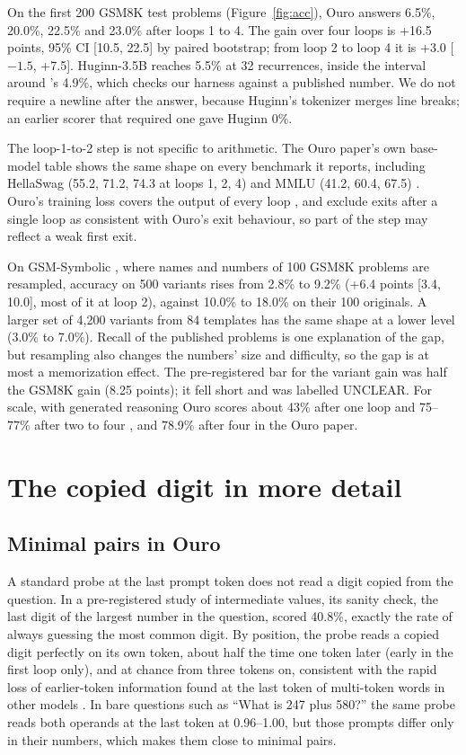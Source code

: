 \documentclass{article}
\begin{document}
On the first 200 GSM8K test problems (Figure~\ref{fig:acc}), Ouro answers 6.5\%, 20.0\%, 22.5\% and 23.0\% after loops 1 to 4. The gain over four loops is +16.5 points, 95\% CI [10.5, 22.5] by paired bootstrap; from loop 2 to loop 4 it is +3.0 [$-1.5$, +7.5]. Huginn-3.5B reaches 5.5\% at 32 recurrences, inside the interval around \citeauthor{lu2025}'s 4.9\%, which checks our harness against a published number. We do not require a newline after the answer, because Huginn's tokenizer merges line breaks; an earlier scorer that required one gave Huginn 0\%.

The loop-1-to-2 step is not specific to arithmetic. The Ouro paper's own base-model table shows the same shape on every benchmark it reports, including HellaSwag (55.2, 71.2, 74.3 at loops 1, 2, 4) and MMLU (41.2, 60.4, 67.5) \citep[Table~10]{zhu2025ouro}. Ouro's training loss covers the output of every loop \citep[Eq.~4]{zhu2025ouro}, and \citet{schwethelm2026b} exclude exits after a single loop as consistent with Ouro's exit behaviour, so part of the step may reflect a weak first exit.

On GSM-Symbolic \citep{mirzadeh2024}, where names and numbers of 100 GSM8K problems are resampled, accuracy on 500 variants rises from 2.8\% to 9.2\% (+6.4 points [3.4, 10.0], most of it at loop 2), against 10.0\% to 18.0\% on their 100 originals. A larger set of 4,200 variants from 84 templates has the same shape at a lower level (3.0\% to 7.0\%). Recall of the published problems is one explanation of the gap, but resampling also changes the numbers' size and difficulty, so the gap is at most a memorization effect. The pre-registered bar for the variant gain was half the GSM8K gain (8.25 points); it fell short and was labelled UNCLEAR. For scale, with generated reasoning Ouro scores about 43\% after one loop and 75--77\% after two to four \citep[Fig.~1]{yang2026stars}, and 78.9\% after four in the Ouro paper.

\section{The copied digit in more detail}\label{app:presence}

\subsection{Minimal pairs in Ouro}\label{sec:mp}

A standard probe at the last prompt token does not read a digit copied from the question. In a pre-registered study of intermediate values, its sanity check, the last digit of the largest number in the question, scored 40.8\%, exactly the rate of always guessing the most common digit. By position, the probe reads a copied digit perfectly on its own token, about half the time one token later (early in the first loop only), and at chance from three tokens on, consistent with the rapid loss of earlier-token information found at the last token of multi-token words in other models \citep{feucht2024}. In bare questions such as ``What is 247 plus 580?'' the same probe reads both operands at the last token at 0.96--1.00, but those prompts differ only in their numbers, which makes them close to minimal pairs.
\end{document}
